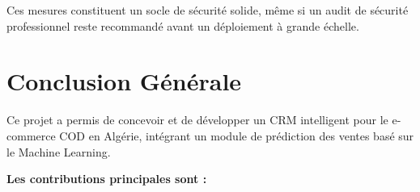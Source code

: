 \documentclass[12pt,a4paper]{report}
\begin{document}
Ces mesures constituent un socle de s\'{e}curit\'{e} solide, m\^{e}me si un audit de s\'{e}curit\'{e} professionnel reste recommand\'{e} avant un d\'{e}ploiement \`{a} grande \'{e}chelle.


\chapter*{Conclusion G\'{e}n\'{e}rale}

Ce projet a permis de concevoir et de d\'{e}velopper un CRM intelligent pour le e-commerce COD en Alg\'{e}rie, int\'{e}grant un module de pr\'{e}diction des ventes bas\'{e} sur le Machine Learning.

\textbf{Les contributions principales sont :}
\end{document}
